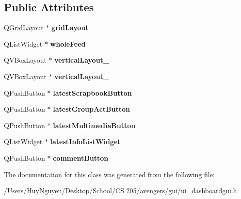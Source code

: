 \subsection*{Public Attributes}
\begin{DoxyCompactItemize}
\item 
Q\+Grid\+Layout $\ast$ {\bfseries grid\+Layout}\hypertarget{classUi__DashboardGUI_a62199217c8df9b7f0eee496549af44b7}{}\label{classUi__DashboardGUI_a62199217c8df9b7f0eee496549af44b7}

\item 
Q\+List\+Widget $\ast$ {\bfseries whole\+Feed}\hypertarget{classUi__DashboardGUI_a806a055eba01a2bb3479ecf4a58b42bb}{}\label{classUi__DashboardGUI_a806a055eba01a2bb3479ecf4a58b42bb}

\item 
Q\+V\+Box\+Layout $\ast$ {\bfseries vertical\+Layout\+\_}\hypertarget{classUi__DashboardGUI_ab8376b24fde779f9cb86fed0fcebe622}{}\label{classUi__DashboardGUI_ab8376b24fde779f9cb86fed0fcebe622}

\item 
Q\+V\+Box\+Layout $\ast$ {\bfseries vertical\+Layout\+\_}\hypertarget{classUi__DashboardGUI_a238cf3edac8dbabef9eba56cbf0e195a}{}\label{classUi__DashboardGUI_a238cf3edac8dbabef9eba56cbf0e195a}

\item 
Q\+Push\+Button $\ast$ {\bfseries latest\+Scrapbook\+Button}\hypertarget{classUi__DashboardGUI_a36c09629184db3d48a5787dfce6775a0}{}\label{classUi__DashboardGUI_a36c09629184db3d48a5787dfce6775a0}

\item 
Q\+Push\+Button $\ast$ {\bfseries latest\+Group\+Act\+Button}\hypertarget{classUi__DashboardGUI_a7ec71a7870bce940a61f98edfb094b36}{}\label{classUi__DashboardGUI_a7ec71a7870bce940a61f98edfb094b36}

\item 
Q\+Push\+Button $\ast$ {\bfseries latest\+Multimedia\+Button}\hypertarget{classUi__DashboardGUI_a8c8c8138b56a7e0e6928b0efa19fc25d}{}\label{classUi__DashboardGUI_a8c8c8138b56a7e0e6928b0efa19fc25d}

\item 
Q\+List\+Widget $\ast$ {\bfseries latest\+Info\+List\+Widget}\hypertarget{classUi__DashboardGUI_aec58bd12157626a980b58fcb8b41978d}{}\label{classUi__DashboardGUI_aec58bd12157626a980b58fcb8b41978d}

\item 
Q\+Push\+Button $\ast$ {\bfseries comment\+Button}\hypertarget{classUi__DashboardGUI_abf397ea3e75f8e09c022a892ee9b2248}{}\label{classUi__DashboardGUI_abf397ea3e75f8e09c022a892ee9b2248}

\end{DoxyCompactItemize}


The documentation for this class was generated from the following file\+:\begin{DoxyCompactItemize}
\item 
/\+Users/\+Huy\+Nguyen/\+Desktop/\+School/\+C\+S 205/avengers/gui/ui\+\_\+dashboardgui.\+h\end{DoxyCompactItemize}
